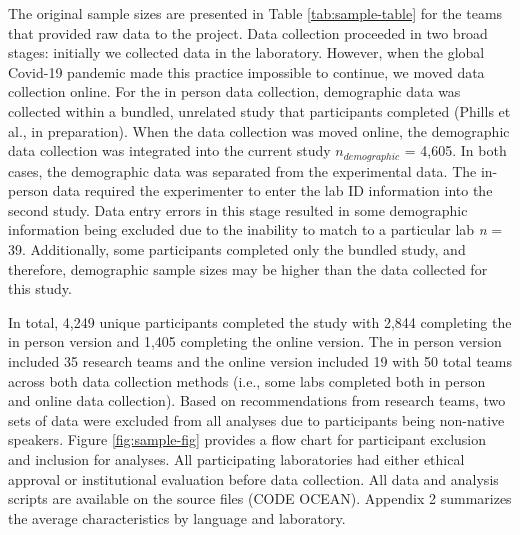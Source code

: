 \documentclass[
  man]{apa7}
\begin{document}
The original sample sizes are presented in Table \ref{tab:sample-table} for the teams that provided raw data to the project. Data collection proceeded in two broad stages: initially we collected data in the laboratory. However, when the global Covid-19 pandemic made this practice impossible to continue, we moved data collection online. For the in person data collection, demographic data was collected within a bundled, unrelated study that participants completed (Phills et al., in preparation). When the data collection was moved online, the demographic data collection was integrated into the current study \(n_{demographic}\) = 4,605. In both cases, the demographic data was separated from the experimental data. The in-person data required the experimenter to enter the lab ID information into the second study. Data entry errors in this stage resulted in some demographic information being excluded due to the inability to match to a particular lab \emph{n} = 39. Additionally, some participants completed only the bundled study, and therefore, demographic sample sizes may be higher than the data collected for this study.

In total, 4,249 unique participants completed the study with 2,844 completing the in person version and 1,405 completing the online version. The in person version included 35 research teams and the online version included 19 with 50 total teams across both data collection methods (i.e., some labs completed both in person and online data collection). Based on recommendations from research teams, two sets of data were excluded from all analyses due to participants being non-native speakers. Figure \ref{fig:sample-fig} provides a flow chart for participant exclusion and inclusion for analyses. All participating laboratories had either ethical approval or institutional evaluation before data collection. All data and analysis scripts are available on the source files (CODE OCEAN). Appendix 2 summarizes the average characteristics by language and laboratory.
\end{document}
